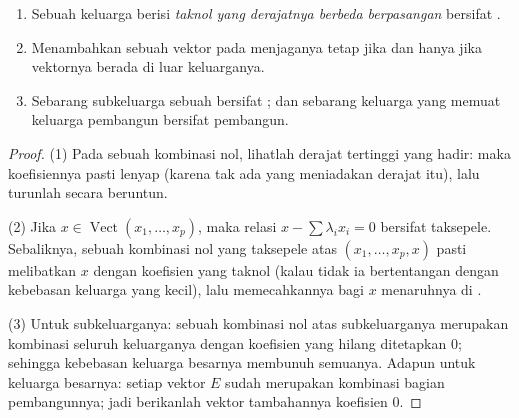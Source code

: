 \begin{proposition}\label{prop:b1:vspaces:freecriteria}
\begin{enumerate}
  \item Sebuah keluarga berisi \emph{ taknol yang derajatnya berbeda
        berpasangan} bersifat .
  \item Menambahkan sebuah vektor pada  menjaganya tetap  jika dan hanya
        jika vektornya berada di luar  keluarganya.
  \item Sebarang subkeluarga sebuah  bersifat ; dan sebarang keluarga
        yang memuat keluarga pembangun bersifat pembangun.
\end{enumerate}
\end{proposition}

\begin{proof}
(1) Pada sebuah kombinasi nol, lihatlah derajat tertinggi yang hadir: maka
koefisiennya pasti lenyap (karena tak ada yang meniadakan derajat itu), lalu turunlah
secara beruntun.

(2) Jika $x \in \operatorname{Vect}(x_1, \dots, x_p)$, maka relasi $x
- \sum\lambda_i x_i = 0$ bersifat taksepele. Sebaliknya, sebuah kombinasi
nol yang taksepele atas $(x_1, \dots, x_p, x)$ pasti melibatkan $x$ dengan
koefisien yang taknol (kalau tidak ia bertentangan dengan kebebasan keluarga
yang kecil), lalu memecahkannya bagi $x$ menaruhnya di .

(3) Untuk subkeluarganya: sebuah kombinasi nol atas subkeluarganya merupakan kombinasi
seluruh keluarganya dengan koefisien yang hilang ditetapkan $0$; sehingga kebebasan
keluarga besarnya membunuh semuanya. Adapun untuk keluarga besarnya: setiap vektor
$E$ sudah merupakan kombinasi bagian pembangunnya; jadi berikanlah
vektor tambahannya koefisien $0$.
\end{proof}

